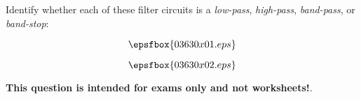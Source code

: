 

Identify whether each of these filter circuits is a {\it low-pass}, {\it high-pass}, {\it band-pass}, or {\it band-stop}:

\vskip 10pt

$$\epsfbox{03630x01.eps}$$







$$\epsfbox{03630x02.eps}$$







{\bf This question is intended for exams only and not worksheets!}.



